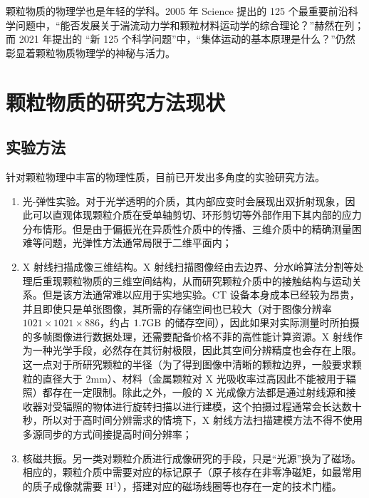 颗粒物质的物理学也是年轻的学科。2005 年 Science 提出的 125 个最重要前沿科学问题\cite{doi:10.1126/science.309.5731.78b}中，“能否发展关于湍流动力学和颗粒材料运动学的综合理论？”赫然在列；而 2021 年提出的 “新 125 个科学问题”\cite{sanders2021125}中，“集体运动的基本原理是什么？”仍然彰显着颗粒物质物理学的神秘与活力。

\section{颗粒物质的研究方法现状}


\subsection{实验方法}

针对颗粒物理中丰富的物理性质，目前已开发出多角度的实验研究方法。

\begin{enumerate}
  \item 光-弹性实验\cite{photoelasticimetry}。对于光学透明的介质，其内部应变时会展现出双折射现象，因此可以直观体现颗粒介质在受单轴剪切、环形剪切等外部作用下其内部的应力分布情形。但是由于偏振光在异质性介质中的传播、三维介质中的精确测量困难等问题\cite{Non-Destructive_3D_Photoelasticity}，光弹性方法通常局限于二维平面内；
  \item X 射线扫描成像三维结构\cite{PhysRevE.68.020301}。X 射线扫描图像经由去边界、分水岭算法分割等处理后重现颗粒物质的三维空间结构，从而研究颗粒介质中的接触结构与运动关系。但是该方法通常难以应用于实地实验。CT 设备本身成本已经较为昂贵，并且即使只是单张图像，其所需的存储空间也已较大（对于图像分辨率 $1021\times 1021 \times 886$，约占 $1.7\unit{\giga\byte}$ 的储存空间），因此如果对实际测量时所拍摄的多帧图像进行数据处理，还需要配备价格不菲的高性能计算资源。X 射线作为一种光学手段，必然存在其衍射极限，因此其空间分辨精度也会存在上限。这一点对于所研究颗粒的半径（为了得到图像中清晰的颗粒边界，一般要求颗粒的直径大于 $2\unit{\milli\meter}$）、材料（金属颗粒对 X 光吸收率过高因此不能被用于辐照）都存在一定限制。除此之外，一般的 X 光成像方法都是通过射线源和接收器对受辐照的物体进行旋转扫描以进行建模，这个拍摄过程通常会长达数十秒，所以对于高时间分辨需求的情境下，X 射线方法扫描建模方法不得不使用多源同步\cite{wang2008ultrafast}的方式间接提高时间分辨率；
  \item 核磁共振\cite{CLARKE2023}。另一类对颗粒介质进行成像研究的手段，只是“光源”换为了磁场。相应的，颗粒介质中需要对应的标记原子（原子核存在非零净磁矩，如最常用的质子成像就需要 H$^{1}$），搭建对应的磁场线圈等也存在一定的技术门槛。
\end{enumerate}

